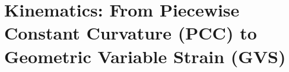 \section{Kinematics: From Piecewise Constant Curvature (PCC) to Geometric Variable Strain (GVS)}\label{sec:background:kinematics}
